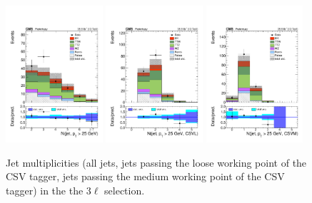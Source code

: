 \begin{figure}[htb]
	\centering 
\includegraphics[width=0.32\textwidth]{plots_leptons/lep_evtsel/3l_SR/3lep_nJet25.pdf}
\includegraphics[width=0.32\textwidth]{plots_leptons/lep_evtsel/3l_SR/nBJetLoose25.pdf}
\includegraphics[width=0.32\textwidth]{plots_leptons/lep_evtsel/3l_SR/nBJetMedium25.pdf}
	\caption{Jet multiplicities (all jets, jets passing the loose working point of the CSV tagger, jets passing the medium working point of the CSV tagger) in the the 3$\ell$ selection.}
	\label{fig:3l_nJet}
\end{figure}

